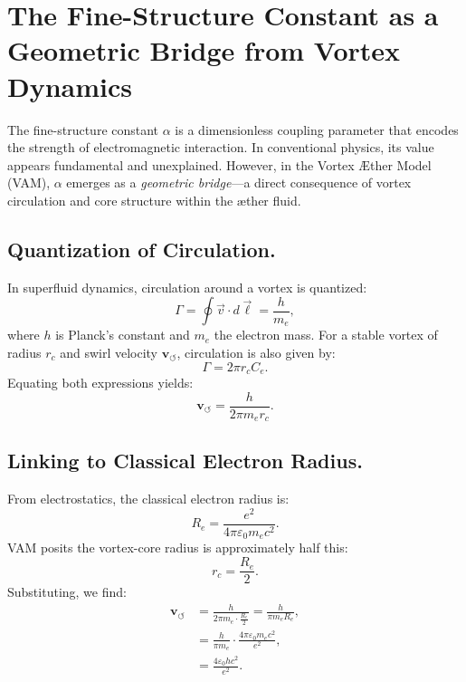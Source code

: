 \documentclass[12pt]{article}
\begin{document}
\section{The Fine-Structure Constant as a Geometric Bridge from Vortex Dynamics}
\label{sec:alpha-geometric-bridge}

The fine-structure constant \( \alpha \) is a dimensionless coupling parameter that encodes the strength of electromagnetic interaction. In conventional physics, its value appears fundamental and unexplained. However, in the Vortex Æther Model (VAM), \( \alpha \) emerges as a \emph{geometric bridge}—a direct consequence of vortex circulation and core structure within the æther fluid.

\subsection{Quantization of Circulation.}
In superfluid dynamics, circulation around a vortex is quantized:
\begin{equation*}
    \Gamma = \oint \vec{v} \cdot d\vec{\ell} = \frac{h}{m_e},
\end{equation*}
where \( h \) is Planck's constant and \( m_e \) the electron mass. For a stable vortex of radius \( r_c \) and swirl velocity \( \mathbf{v}_{\scriptscriptstyle\boldsymbol{\circlearrowleft}} \), circulation is also given by:
\begin{equation*}
    \Gamma = 2 \pi r_c C_e.
\end{equation*}
Equating both expressions yields:
\begin{equation}
    \mathbf{v}_{\scriptscriptstyle\boldsymbol{\circlearrowleft}} = \frac{h}{2\pi m_e r_c}.
\end{equation}

\subsection{Linking to Classical Electron Radius.}
From electrostatics, the classical electron radius is:
\begin{equation*}
    R_e = \frac{e^2}{4\pi \varepsilon_0 m_e c^2}.
\end{equation*}
VAM posits the vortex-core radius is approximately half this:
\begin{equation*}
    r_c = \frac{R_e}{2}.
\end{equation*}
Substituting, we find:
\begin{align}
    \mathbf{v}_{\scriptscriptstyle\boldsymbol{\circlearrowleft}} &= \frac{h}{2\pi m_e \cdot \frac{R_e}{2}} = \frac{h}{\pi m_e R_e}, \\
    &= \frac{h}{\pi m_e} \cdot \frac{4\pi \varepsilon_0 m_e c^2}{e^2}, \\
    &= \frac{4 \varepsilon_0 h c^2}{e^2}.
\end{align}
\end{document}
